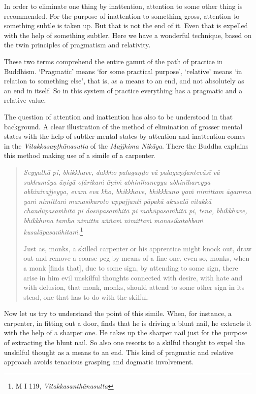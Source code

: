 In order to eliminate one thing by inattention, attention to some other thing is recommended. For the purpose of inattention to something gross, attention to something subtle is taken up. But that is not the end of it. Even that is expelled with the help of something subtler. Here we have a wonderful technique, based on the twin principles of pragmatism and relativity.

These two terms comprehend the entire gamut of the path of practice in Buddhism. `Pragmatic' means `for some practical purpose', `relative' means `in relation to something else', that is, as a means to an end, and not absolutely as an end in itself. So in this system of practice everything has a pragmatic and a relative value.

The question of attention and inattention has also to be understood in that background. A clear illustration of the method of elimination of grosser mental states with the help of subtler mental states by attention and inattention comes in the \emph{Vitakkasaṇṭhānasutta} of the \emph{Majjhima Nikāya}. There the Buddha explains this method making use of a simile of a carpenter.

\begin{quote}
\emph{Seyyathā pi, bhikkhave, dakkho palagaṇḍo vā palagaṇḍantevāsī vā sukhumāya āṇiyā oḷārikaṁ āṇiṁ abhinīhaneyya abhinīhareyya abhinivajjeyya, evam eva kho, bhikkhave, bhikkhuno yaṁ nimittam āgamma yaṁ nimittaṁ manasikaroto uppajjanti pāpakā akusalā vitakkā chandūpasaṁhitā pi dosūpasaṁhitā pi mohūpasaṁhitā pi, tena, bhikkhave, bhikkhunā tamhā nimittā aññaṁ nimittaṁ manasikātabbaṁ kusalūpasaṁhitaṁ.}\footnote{M I 119, \emph{Vitakkasanthānasutta}}

Just as, monks, a skilled carpenter or his apprentice might knock out, draw out and remove a coarse peg by means of a fine one, even so, monks, when a monk {[}finds that{]}, due to some sign, by attending to some sign, there arise in him evil unskilful thoughts connected with desire, with hate and with delusion, that monk, monks, should attend to some other sign in its stead, one that has to do with the skilful.
\end{quote}

Now let us try to understand the point of this simile. When, for instance, a carpenter, in fitting out a door, finds that he is driving a blunt nail, he extracts it with the help of a sharper one. He takes up the sharper nail just for the purpose of extracting the blunt nail. So also one resorts to a skilful thought to expel the unskilful thought as a means to an end. This kind of pragmatic and relative approach avoids tenacious grasping and dogmatic involvement.


